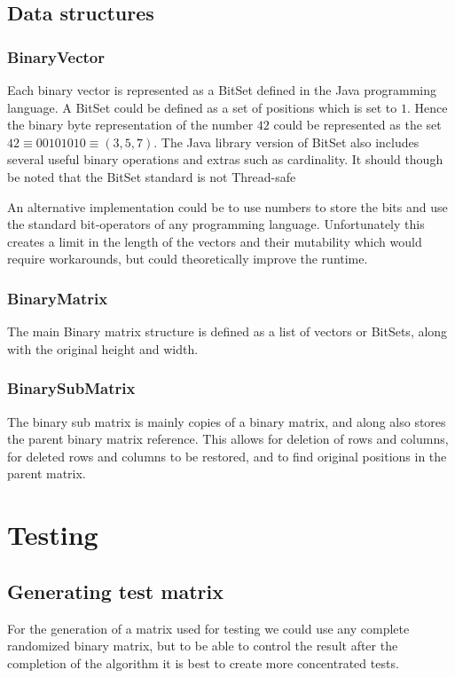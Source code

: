 \documentclass[a4paper]{article}
\begin{document}
\subsection{Data structures}
\subsubsection{BinaryVector}
Each binary vector is represented as a BitSet defined in the Java programming language. A 
BitSet could be defined as a set of positions which is set to $1$. Hence the binary byte 
representation of the number $42$ could be represented as the set 
$42 \equiv 00101010 \equiv (3,5,7)$. The Java library version of BitSet also includes several 
useful binary operations and extras such as cardinality. It should though be noted that the 
BitSet standard is not Thread-safe \cite{bitset_java_14_2020}

An alternative implementation could be to use numbers to store the bits and use the standard 
bit-operators of any programming language. Unfortunately this creates a limit in the length 
of the vectors and their mutability which would require workarounds, but could theoretically 
improve the runtime.

\subsubsection{BinaryMatrix}
The main Binary matrix structure is defined as a list of vectors or BitSets, along with the 
original height and width.

\subsubsection{BinarySubMatrix}
The binary sub matrix is mainly copies of a binary matrix, and along also stores the parent 
binary matrix reference. This allows for deletion of rows and columns, for deleted rows and 
columns to be restored, and to find original positions in the parent matrix.

%
%
\newpage

\section{Testing}
\subsection{Generating test matrix}
For the generation of a matrix used for testing we could use any complete randomized binary 
matrix, but to be able to control the result after the completion of the algorithm it is best 
to create more concentrated tests.
\end{document}
